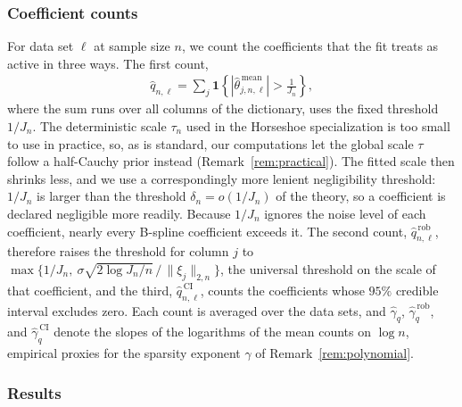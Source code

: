 \subsubsection{Coefficient counts}

For data set $\ell$ at sample size $n$, we count the coefficients that the fit treats as active in three ways. The first count,
\begin{align*}
\widehat q_{n,\ell}
=\sum_{j}
\mathbf 1\!\left\{|\widehat\theta^{\,\mathrm{mean}}_{j,n,\ell}|>\frac1{J_n}\right\},
\end{align*}
where the sum runs over all columns of the dictionary, uses the fixed threshold $1/J_n$. The deterministic scale $\tau_n$ used in the Horseshoe specialization is too small to use in practice, so, as is standard, our computations let the global scale $\tau$ follow a half-Cauchy prior instead (Remark~\ref{rem:practical}). The fitted scale then shrinks less, and we use a correspondingly more lenient negligibility threshold: $1/J_n$ is larger than the threshold $\delta_n=o(1/J_n)$ of the theory, so a coefficient is declared negligible more readily. Because $1/J_n$ ignores the noise level of each coefficient, nearly every B-spline coefficient exceeds it. The second count, $\widehat q^{\,\mathrm{rob}}_{n,\ell}$, therefore raises the threshold for column $j$ to $\max\{1/J_n,\ \sigma\sqrt{2\log J_n/n}\,/\,\|\xi_j\|_{2,n}\}$, the universal threshold on the scale of that coefficient, and the third, $\widehat q^{\,\mathrm{CI}}_{n,\ell}$, counts the coefficients whose $95\%$ credible interval excludes zero. Each count is averaged over the data sets, and $\widehat\gamma_q$, $\widehat\gamma_q^{\,\mathrm{rob}}$, and $\widehat\gamma_q^{\,\mathrm{CI}}$ denote the slopes of the logarithms of the mean counts on $\log n$, empirical proxies for the sparsity exponent $\gamma$ of Remark~\ref{rem:polynomial}.

\subsubsection{Results}

